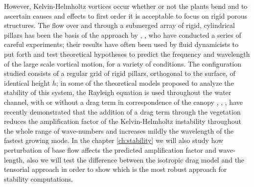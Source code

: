 However, Kelvin-Helmholtz vortices occur whether or not the plants bend and to ascertain causes and effects to first order it is acceptable to focus on rigid porous structures.
The flow over and through a submerged array of rigid, cylindrical pillars has been the basis of the approach by \citet{ghisalberti2002mixing}, \citet{ghisalberti2004limited}, \citet{ghisalberti2005mass} who have conducted a series of careful experiments; their results have often been used by fluid dynamicists to put forth and test theoretical hypotheses to predict the frequency and
wavelength of the large scale vortical motion, for a variety of conditions.
The configuration studied consists of a regular grid of rigid pillars, orthogonal to the surface, of identical height $h$; in some
of the theoretical models proposed to analyze the stability of this system, the Rayleigh equation is
used throughout the water channel, with or without a drag term in correspondence of the canopy \citet{raupach1996coherent}, \citet{py2004mixing}, \citet{singh2016linear}, \citet{zampogna2016instability} have recently demonstrated that the addition of a drag term through the vegetation reduces the amplification factor of the Kelvin-Helmholtz instability throughout the whole range of wave-numbers and increases mildly the wavelength of the fastest growing mode.
In the chapter \ref{ch:stability} we will also study how perturbation of base flow affects the predicted amplification factor and wave-length, also we will test the difference between the isotropic drag model and the tensorial approach in order to show which is the most robust approach for stability computations.






